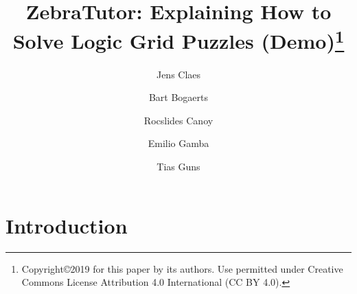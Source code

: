 \documentclass[runningheads]{llncs}
\newcommand{\zebratutor}{ZebraTutor\xspace}
\newcommand{\ourtool}{\zebratutor}
\newcommand{\idp}{IDP\xspace}
\begin{document}
%
\title{\zebratutor: Explaining How to Solve Logic Grid Puzzles (Demo)\thanks{Copyright\copyright 2019 for this paper by its authors. Use permitted under Creative Commons License Attribution 4.0 International (CC BY 4.0).}}
%
%
\author{Jens Claes \and
Bart Bogaerts \and
Rocslides Canoy \and 
Emilio Gamba \and 
Tias Guns }
%
%
%
\maketitle              %
%
% 
%
%
%
\section{Introduction}
% 
\end{document}
